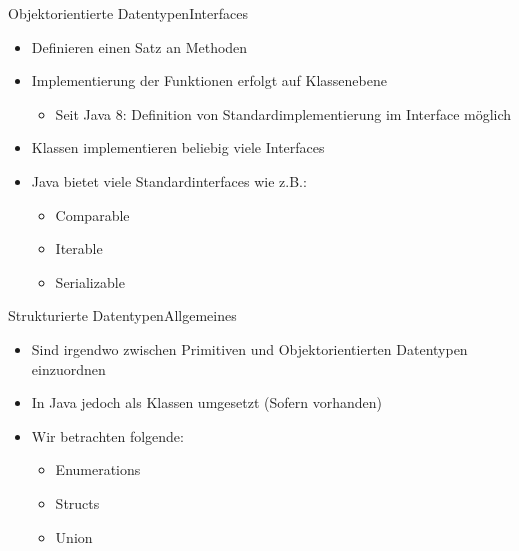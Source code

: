 \begin{frame}{Objektorientierte Datentypen}{Interfaces}
    \begin{itemize}
        \item Definieren einen Satz an Methoden
        \item Implementierung der Funktionen erfolgt auf Klassenebene
        \begin{itemize}
            \item Seit Java 8: Definition von Standardimplementierung im Interface möglich
        \end{itemize}
        \item Klassen implementieren beliebig viele Interfaces
        \item Java bietet viele Standardinterfaces wie z.B.:
        \begin{itemize}
            \item Comparable
            \item Iterable
            \item Serializable
        \end{itemize}
    \end{itemize}
\end{frame}

\begin{frame}{Strukturierte Datentypen}{Allgemeines}
    \begin{itemize}
        \item Sind irgendwo zwischen Primitiven und Objektorientierten Datentypen einzuordnen
        \item In Java jedoch als Klassen umgesetzt (Sofern vorhanden)
        \item Wir betrachten folgende:
        \begin{itemize}
            \item Enumerations
            \item Structs
            \item Union
        \end{itemize}
    \end{itemize}
\end{frame}

